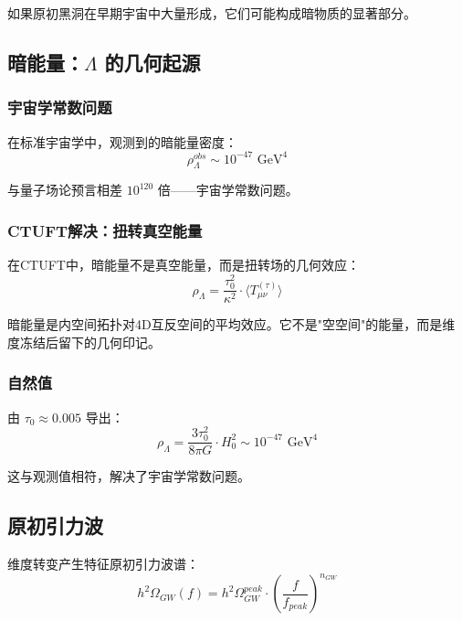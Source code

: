 如果原初黑洞在早期宇宙中大量形成，它们可能构成暗物质的显著部分。

\subsection{暗能量：$\Lambda$ 的几何起源}

\subsubsection{宇宙学常数问题}

在标准宇宙学中，观测到的暗能量密度：
\begin{equation}
    \rho_\Lambda^{obs} \sim 10^{-47} \text{ GeV}^4
\end{equation}

与量子场论预言相差 $10^{120}$ 倍——宇宙学常数问题。

\subsubsection{CTUFT解决：扭转真空能量}

在CTUFT中，暗能量不是真空能量，而是扭转场的几何效应：
\begin{equation}
    \rho_\Lambda = \frac{\tau_0^2}{\kappa^2} \cdot \langle T_{\mu\nu}^{(\tau)} \rangle
\end{equation}

\begin{insight}[几何暗能量]
暗能量是内空间拓扑对4D互反空间的平均效应。它不是"空空间"的能量，而是维度冻结后留下的几何印记。
\end{insight}

\subsubsection{自然值}

由 $\tau_0 \approx 0.005$ 导出：
\begin{equation}
    \rho_\Lambda = \frac{3\tau_0^2}{8\pi G} \cdot H_0^2 \sim 10^{-47} \text{ GeV}^4
\end{equation}

这与观测值相符，解决了宇宙学常数问题。

\subsection{原初引力波}

维度转变产生特征原初引力波谱：
\begin{equation}
    h^2\Omega_{GW}(f) = h^2\Omega_{GW}^{peak} \cdot \left(\frac{f}{f_{peak}}\right)^{n_{GW}}
\end{equation}

